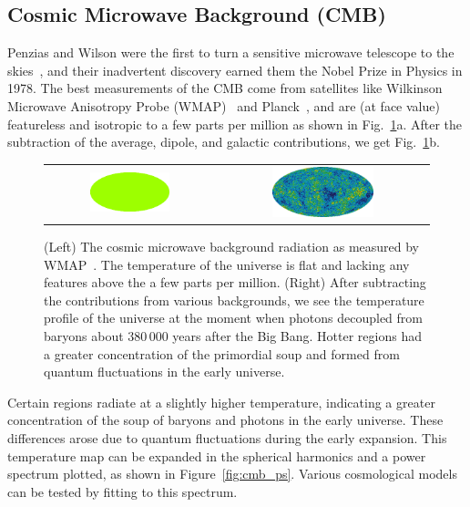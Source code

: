\subsection{Cosmic Microwave Background (CMB)}

Penzias and Wilson were the first to turn a sensitive microwave telescope to the skies~\cite{Penzias:1965a,Penzias:1965b}, and their inadvertent discovery earned them the Nobel Prize in Physics in 1978. The best measurements of the CMB come from satellites like Wilkinson Microwave Anisotropy Probe (WMAP)~\cite{Bennett:2012zja} and Planck~\cite{Ade:2015xua}, and are (at face value) featureless and isotropic to a few parts per million as shown in Fig.~\ref{fig:cmb}a. After the subtraction of the average, dipole, and galactic contributions, we get Fig.~\ref{fig:cmb}b.

\begin{figure}[htb]
    \begin{tabular}{cc}
    \includegraphics[width=0.5\textwidth]{figures/dm/CMB0} & \includegraphics[width=0.5\textwidth]{figures/dm/CMB3} \\
    \end{tabular}
    \caption{(Left) The cosmic microwave background radiation as measured by WMAP~\cite{Bennett:2012zja}. The temperature of the universe is flat and lacking any features above the a few parts per million. (Right) After subtracting the contributions from various backgrounds, we see the temperature profile of the universe at the moment when photons decoupled from baryons about $380\,000$ years after the Big Bang. Hotter regions had a greater concentration of the primordial soup and formed from quantum fluctuations in the early universe.}\label{fig:cmb}
\end{figure}

Certain regions radiate at a slightly higher temperature, indicating a greater concentration of the soup of baryons and photons in the early universe. These differences arose due to quantum fluctuations during the early expansion. This temperature map can be expanded in the spherical harmonics and a power spectrum plotted, as shown in Figure~\ref{fig:cmb_ps}. Various cosmological models can be tested by fitting to this spectrum.

